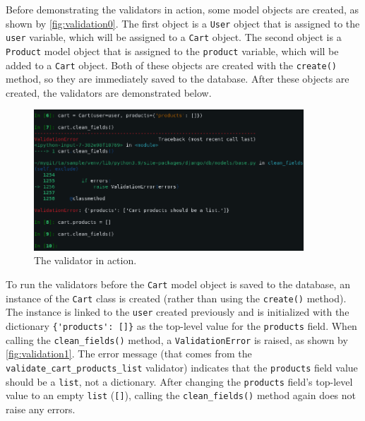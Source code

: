 Before demonstrating the validators in action, some model objects are created,
as shown by \autoref{fig:validation0}. The first object is a \verb|User| object
that is assigned to the \verb|user| variable, which will be assigned to a
\verb|Cart| object. The second object is a \verb|Product| model object that is
assigned to the \verb|product| variable, which will be added to a \verb|Cart|
object. Both of these objects are created with the \verb|create()| method,
so they are immediately saved to the database. After these objects are created,
the validators are demonstrated below.

\begin{figure}
	\centering
    \includegraphics[width=0.90\textwidth]{pics/validation1.png}
	\caption{The  validator in action.}
	\label{fig:validation1}
\end{figure}

To run the validators before the \verb|Cart| model object is saved to the
database, an instance of the \verb|Cart| class is created (rather than using
the \verb|create()| method). The instance is linked to the \verb|user| created
previously and is initialized with the dictionary \verb|{'products': []}| as
the top-level value for the \verb|products| field. When calling the
\verb|clean_fields()| method, a \verb|ValidationError| is raised, as shown by
\autoref{fig:validation1}. The error message (that comes from the
\verb|validate_cart_products_list| validator) indicates that the
\verb|products| field value should be a \verb|list|, not a dictionary. After
changing the \verb|products| field's top-level value to an empty \verb|list|
(\verb|[]|), calling the \verb|clean_fields()| method again does not raise any
errors.

